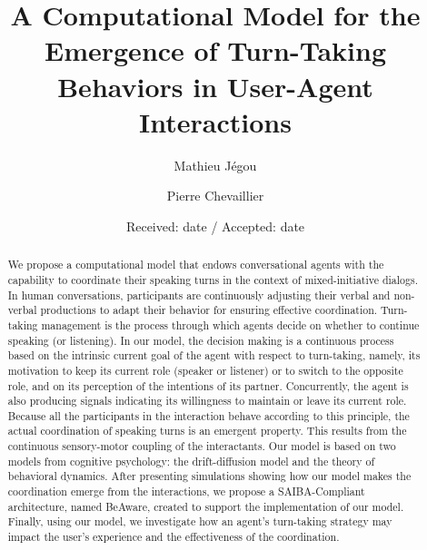 \documentclass[twocolumn]{svjour3}
\begin{document}
\title{A Computational Model for the Emergence of Turn-Taking Behaviors in User-Agent Interactions}

\author{Mathieu J\'egou  \and
        Pierre Chevaillier
}


\date{Received: date / Accepted: date}

\maketitle 

\begin{abstract}
We propose a computational model that endows conversational agents with the capability to coordinate their speaking turns in the context of mixed-initiative dialogs.
In human conversations, participants are continuously adjusting their verbal and non-verbal productions to adapt their behavior for ensuring  effective coordination. Turn-taking management is the process through which agents decide on whether to continue speaking (or listening). In our model, the decision making is a continuous process based on the intrinsic current goal of the agent with respect to turn-taking, namely, its motivation to keep its current role (speaker or listener) or to switch to the opposite role, and on its perception of the intentions of its partner. Concurrently, the agent is also producing signals indicating its willingness to maintain or leave its current role. Because all the participants in the interaction behave according to this principle, the actual coordination of speaking turns is an emergent property. This results from the continuous sensory-motor coupling of the interactants. Our model is based on two models from cognitive psychology: the drift-diffusion model and the theory of behavioral dynamics. After presenting simulations showing how our model makes the coordination emerge from the interactions, we propose a SAIBA-Compliant architecture, named BeAware, created to support the implementation of our model. Finally, using our model, we investigate how an agent's turn-taking strategy may impact the user's experience and the effectiveness of the coordination.

 
\end{abstract}
\end{document}
